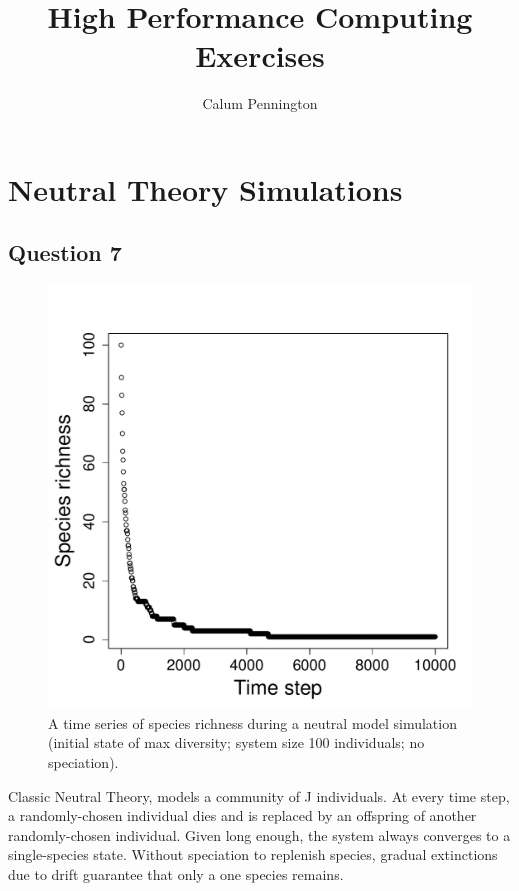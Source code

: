 \documentclass[11pt]{article}
\title{\textbf{High Performance Computing Exercises}}
\author{Calum Pennington}
\date{} %
\begin{document}
\maketitle

\section*{Neutral Theory Simulations}

\subsection*{Question 7}

\begin{figure}[h]
\centering
\includegraphics[width=0.5\linewidth]{../Results/Question_7.pdf}
\caption{A time series of species richness during a neutral model simulation (initial state of max diversity; system size 100 individuals; no speciation).}
\end{figure}

Classic Neutral Theory, models a community of J individuals. At every time step, a randomly-chosen individual dies and is replaced by an offspring of another randomly-chosen individual. Given long enough, the system always converges to a single-species state. Without speciation to replenish species, gradual extinctions due to drift guarantee that only a one species remains.

\newpage
\end{document}
